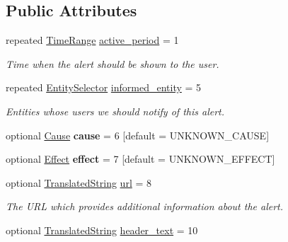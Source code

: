 \subsection*{Public Attributes}
\begin{DoxyCompactItemize}
\item 
repeated \hyperlink{structTimeRange}{Time\+Range} \hyperlink{structAlert_aa51a558e2f4de6230d9c476330848f38}{active\+\_\+period} = 1
\begin{DoxyCompactList}\small\item\em Time when the alert should be shown to the user. \end{DoxyCompactList}\item 
repeated \hyperlink{structEntitySelector}{Entity\+Selector} \hyperlink{structAlert_a5d21a1ff3069fcba37def8fca209bf7e}{informed\+\_\+entity} = 5\hypertarget{structAlert_a5d21a1ff3069fcba37def8fca209bf7e}{}\label{structAlert_a5d21a1ff3069fcba37def8fca209bf7e}

\begin{DoxyCompactList}\small\item\em Entities whose users we should notify of this alert. \end{DoxyCompactList}\item 
optional \hyperlink{structAlert_a199c4ca00d947ef89a8523c495ad2d2f}{Cause} {\bfseries cause} = 6 \mbox{[}default = U\+N\+K\+N\+O\+W\+N\+\_\+\+C\+A\+U\+SE\mbox{]}\hypertarget{structAlert_ad00227a478f594ce9801014aa882506f}{}\label{structAlert_ad00227a478f594ce9801014aa882506f}

\item 
optional \hyperlink{structAlert_a4378fb5cc59d723ec02ea80694678d98}{Effect} {\bfseries effect} = 7 \mbox{[}default = U\+N\+K\+N\+O\+W\+N\+\_\+\+E\+F\+F\+E\+CT\mbox{]}\hypertarget{structAlert_a8ae535031c42426c7f81a258757bcfb0}{}\label{structAlert_a8ae535031c42426c7f81a258757bcfb0}

\item 
optional \hyperlink{structTranslatedString}{Translated\+String} \hyperlink{structAlert_a5c3df11dcce290fe3df880b205da700d}{url} = 8\hypertarget{structAlert_a5c3df11dcce290fe3df880b205da700d}{}\label{structAlert_a5c3df11dcce290fe3df880b205da700d}

\begin{DoxyCompactList}\small\item\em The U\+RL which provides additional information about the alert. \end{DoxyCompactList}\item 
optional \hyperlink{structTranslatedString}{Translated\+String} \hyperlink{structAlert_a285aca0882b36a6e6cb1c64cb9d8399c}{header\+\_\+text} = 10\hypertarget{structAlert_a285aca0882b36a6e6cb1c64cb9d8399c}{}\label{structAlert_a285aca0882b36a6e6cb1c64cb9d8399c}


\end{DoxyCompactItemize}
